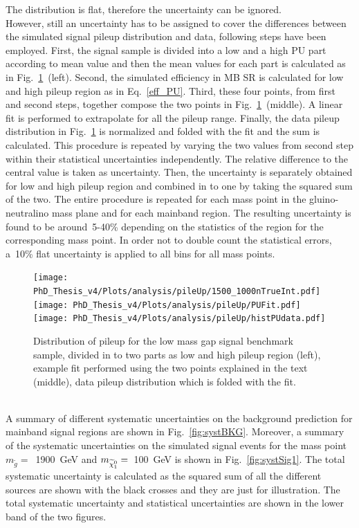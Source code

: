 The distribution is flat, therefore the uncertainty can be ignored.\\
However, still an uncertainty has to be assigned to cover the differences between the simulated signal pileup distribution and data, following steps have been employed. First, the signal sample is divided into a low and a high PU part according to mean value and then the mean values for each part is calculated as in Fig.~\ref{fig:pileUpsystmech}~(left).
Second, the simulated efficiency in MB SR is calculated for low and high pileup region as in Eq.~\ref{eff_PU}. Third, these four points, from first and second steps, together compose the two points in Fig.~\ref{fig:pileUpsystmech}~(middle). A linear fit is performed to extrapolate for all the pileup range. Finally, the data pileup distribution in Fig.~\ref{fig:pileUpsystmech} is normalized and folded with the fit and the sum is calculated. 
This procedure is repeated by varying the two values from second step within their statistical uncertainties independently.
The relative difference to the central value is taken as uncertainty.
Then, the uncertainty is separately obtained for low and high pileup region and combined in to one by taking the squared sum of the two. The entire procedure is repeated for each mass point in the gluino-neutralino mass plane and for each mainband region. The resulting uncertainty is found to be around~5-40\% depending on the statistics of the region for the corresponding mass point. In order not to double count the statistical errors, a~10\% flat uncertainty is applied to all bins for all mass points.\\
\begin{figure}[!hbt]
    \begin{center}
  \texttt{[image: PhD\_Thesis\_v4/Plots/analysis/pileUp/1500\_1000nTrueInt.pdf]}
   \texttt{[image: PhD\_Thesis\_v4/Plots/analysis/pileUp/PUFit.pdf]}
    \texttt{[image: PhD\_Thesis\_v4/Plots/analysis/pileUp/histPUdata.pdf]}
  \caption{ \label{fig:pileUpsystmech} Distribution of pileup for the low mass gap signal benchmark sample, divided in to two parts as low and high pileup region (left), example fit performed using the two points explained in the text (middle), data pileup  distribution which is folded with the fit.}
  \end{center}
\end{figure}
\\
A summary of different systematic uncertainties on the background prediction for mainband signal regions are shown in Fig.~\ref{fig:systBKG}.
Moreover, a summary of the systematic uncertainties on the simulated signal events for the mass point $m_{\tilde{g}}=$~1900~GeV and $m_{\widetilde{\chi}^0_1}=$~100~GeV is shown in Fig.~\ref{fig:systSig1}. The total systematic uncertainty is calculated as the squared sum of all the different sources are shown with the black crosses and they are just for illustration. The total systematic uncertainty and statistical uncertainties are shown in the lower band of the two figures.\\
